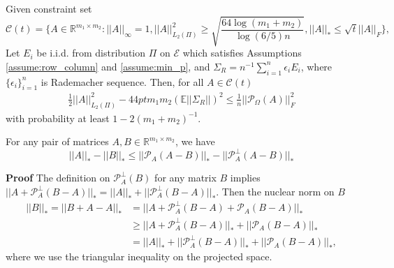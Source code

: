 \documentclass{article} %
\newcommand\mc{\mathcal} %
\begin{document}
\begin{lemma} \label{lmm:constraintset} Given constraint set
\begin{equation}
\mc{C}(t) = \bigg\{ A \in \mathbb{R}^{m_1 \times m_2}: ||A||_\infty = 1, ||A||_{L_2(\Pi)}^2 \geq \sqrt{\frac{64\log(m_1+m_2)}{\log(6/5)n}}, ||A||_* \leq \sqrt{t}||A||_F \bigg\},
\end{equation}
Let $E_i$ be i.i.d. from distribution $\Pi$ on $\mc{E}$ which satisfies Assumptions \ref{assume:row_column} and \ref{assume:min_p}, and $\Sigma_R = n^{-1}\sum_{i=1}^{n}\epsilon_i E_i$, where $\{\epsilon_i\}_{i=1}^{n}$ is Rademacher sequence. Then, for all $A\in \mc{C}(t)$
\begin{align}
\frac{1}{2}||A||_{L_2(\Pi)}^2  - 44 ptm_1m_2(\mathbb{E}||\Sigma_R||)^2 \leq \frac{1}{n}||\mc{P}_{\Omega}(A)||_F^2
\end{align}
with probability at least $1-2(m_1+m_2)^{-1}$.
\end{lemma}

\begin{lemma}\label{lmm:normdiff}For any pair of matrices $A, B \in \mathbb{R}^{m_1 \times m_2}$, we have
\begin{equation}
||A||_* - ||B||_* \leq ||\mc{P}_A(A-B)||_* - ||\mc{P}_A^\perp(A-B)||_*
\end{equation}
\end{lemma}
\textbf{Proof} The definition on $\mc{P}_A^\perp(B)$ for any matrix $B$ implies $||A + \mc{P}_A^\perp(B-A)||_* = ||A||_* + ||\mc{P}_A^\perp(B-A)||_*$. Then the nuclear norm on $B$
\begin{align}
||B||_* = ||B + A - A||_* &= ||A + \mc{P}^\perp_A(B-A) + \mc{P}_A(B-A)||_*\\
&\geq ||A + \mc{P}^\perp_A(B-A)||_* + ||\mc{P}_A(B-A)||_*\\
&= ||A||_* + ||\mc{P}^\perp_A(B-A)||_* + ||\mc{P}_A(B-A)||_*,
\end{align}
where we use the triangular inequality on the projected space.
\end{document}
